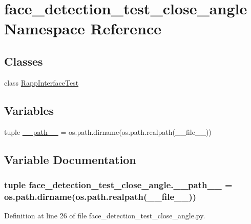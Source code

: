 \hypertarget{namespaceface__detection__test__close__angle}{\section{face\-\_\-detection\-\_\-test\-\_\-close\-\_\-angle Namespace Reference}
\label{namespaceface__detection__test__close__angle}
}
\subsection*{Classes}
\begin{DoxyCompactItemize}
\item 
class \hyperlink{classface__detection__test__close__angle_1_1RappInterfaceTest}{Rapp\-Interface\-Test}
\end{DoxyCompactItemize}
\subsection*{Variables}
\begin{DoxyCompactItemize}
\item 
tuple \hyperlink{namespaceface__detection__test__close__angle_aaa0cee696fa2dac1f28f21b3f4b66d36}{\-\_\-\-\_\-path\-\_\-\-\_\-} = os.\-path.\-dirname(os.\-path.\-realpath(\-\_\-\-\_\-file\-\_\-\-\_\-))
\end{DoxyCompactItemize}


\subsection{Variable Documentation}
\hypertarget{namespaceface__detection__test__close__angle_aaa0cee696fa2dac1f28f21b3f4b66d36}{
\subsubsection[{\-\_\-\-\_\-path\-\_\-\-\_\-}]{\setlength{\rightskip}{0pt plus 5cm}tuple face\-\_\-detection\-\_\-test\-\_\-close\-\_\-angle.\-\_\-\-\_\-path\-\_\-\-\_\- = os.\-path.\-dirname(os.\-path.\-realpath(\-\_\-\-\_\-file\-\_\-\-\_\-))}}\label{namespaceface__detection__test__close__angle_aaa0cee696fa2dac1f28f21b3f4b66d36}


Definition at line 26 of file face\-\_\-detection\-\_\-test\-\_\-close\-\_\-angle.\-py.


